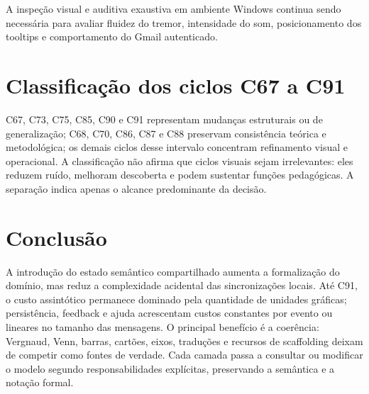 \documentclass[12pt,a4paper]{article}
\begin{document}
A inspeção visual e auditiva exaustiva em ambiente Windows continua sendo necessária para avaliar fluidez do tremor, intensidade do som, posicionamento dos tooltips e comportamento do Gmail autenticado.

\section{Classificação dos ciclos C67 a C91}

C67, C73, C75, C85, C90 e C91 representam mudanças estruturais ou de generalização; C68, C70, C86, C87 e C88 preservam consistência teórica e metodológica; os demais ciclos desse intervalo concentram refinamento visual e operacional. A classificação não afirma que ciclos visuais sejam irrelevantes: eles reduzem ruído, melhoram descoberta e podem sustentar funções pedagógicas. A separação indica apenas o alcance predominante da decisão.

\section{Conclusão}

A introdução do estado semântico compartilhado aumenta a formalização do domínio, mas reduz a complexidade acidental das sincronizações locais. Até C91, o custo assintótico permanece dominado pela quantidade de unidades gráficas; persistência, feedback e ajuda acrescentam custos constantes por evento ou lineares no tamanho das mensagens. O principal benefício é a coerência: Vergnaud, Venn, barras, cartões, eixos, traduções e recursos de scaffolding deixam de competir como fontes de verdade. Cada camada passa a consultar ou modificar o modelo segundo responsabilidades explícitas, preservando a semântica e a notação formal.
\end{document}
